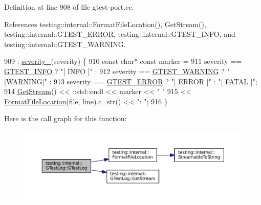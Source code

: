 Definition at line 908 of file gtest-\/port.\+cc.



References testing\+::internal\+::\+Format\+File\+Location(), Get\+Stream(), testing\+::internal\+::\+G\+T\+E\+S\+T\+\_\+\+E\+R\+R\+OR, testing\+::internal\+::\+G\+T\+E\+S\+T\+\_\+\+I\+N\+FO, and testing\+::internal\+::\+G\+T\+E\+S\+T\+\_\+\+W\+A\+R\+N\+I\+NG.


\begin{DoxyCode}
909     : \hyperlink{classtesting_1_1internal_1_1GTestLog_ad8f75f5845900d0d2fd3cbb048a861be}{severity\_}(severity) \{
910   \textcolor{keyword}{const} \textcolor{keywordtype}{char}* \textcolor{keyword}{const} marker =
911       severity == \hyperlink{namespacetesting_1_1internal_aa6255ef3b023c5b4e1a2198d887fb977aff315e0913fcda86fe4de882bf5e33e9}{GTEST\_INFO} ?    \textcolor{stringliteral}{"[  INFO ]"} :
912       severity == \hyperlink{namespacetesting_1_1internal_aa6255ef3b023c5b4e1a2198d887fb977a7a051bc2794f15a4bf0eab40562a304c}{GTEST\_WARNING} ? \textcolor{stringliteral}{"[WARNING]"} :
913       severity == \hyperlink{namespacetesting_1_1internal_aa6255ef3b023c5b4e1a2198d887fb977a651e9cd2a904e0c8210536271b875f75}{GTEST\_ERROR} ?   \textcolor{stringliteral}{"[ ERROR ]"} : \textcolor{stringliteral}{"[ FATAL ]"};
914   \hyperlink{classtesting_1_1internal_1_1GTestLog_aebb92e67d98eca69f0347d5121dab27a}{GetStream}() << ::std::endl << marker << \textcolor{stringliteral}{" "}
915               << \hyperlink{namespacetesting_1_1internal_a31b7c3abed4a7c395f42c61e993989f4}{FormatFileLocation}(file, line).c\_str() << \textcolor{stringliteral}{": "};
916 \}
\end{DoxyCode}
Here is the call graph for this function\+:
\nopagebreak
\begin{figure}[H]
\begin{center}
\leavevmode
\includegraphics[width=350pt]{classtesting_1_1internal_1_1GTestLog_a364691bf972983a59cfa2891062a64af_cgraph}
\end{center}
\end{figure}
\mbox{\label{classtesting_1_1internal_1_1GTestLog_a978a099703bbaa0f380216e8d7ee03d3}} 
